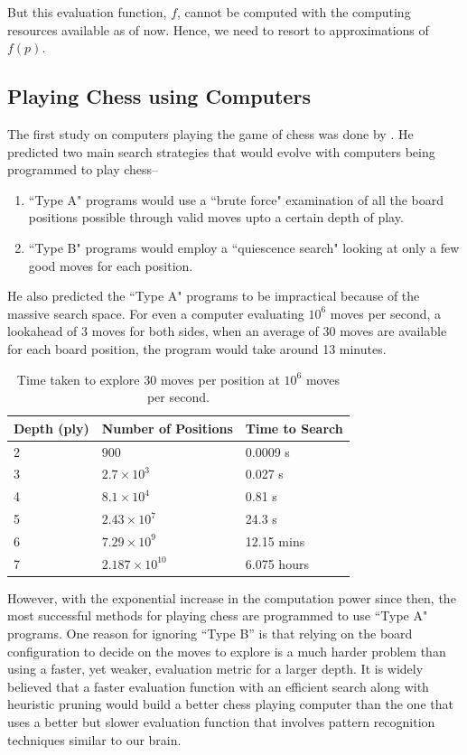 But this evaluation function, $f$, cannot be computed with the computing 
resources available as of now. Hence, we need to resort to approximations of 
$f(p)$.


\subsection{Playing Chess using Computers}
\label{section:playing-background}
The first study on computers playing the game of chess was done by 
\citet{shannon1950xxii}. He predicted two main search strategies that would 
evolve with computers being programmed to play chess--
\begin{enumerate}
\item ``Type A" programs would use a ``brute force" examination of all the 
board 
positions possible through valid moves upto a certain depth of play.
\item ``Type B" programs would employ a ``quiescence search" looking at only a 
few good moves for each position. 
\end{enumerate}
He also predicted the ``Type A" programs to be impractical because of the 
massive search space. For even a computer evaluating $10^6$ moves per second, a 
lookahead of 3 moves for both sides, when an average of 30 moves are available 
for each board position, the program would take around 13 minutes.\\
\begin{table}[h]
\centering
\begin{tabular}{lll}
\toprule
Depth (ply) & Number of Positions & Time to Search \\ 
\midrule
2           & $900$                 & 0.0009 s       \\ 
3           & $2.7\times10^3$       & 0.027 s        \\ 
4           & $8.1\times10^4$       & 0.81 s         \\ 
5           & $2.43\times 10^7$    & 24.3 s         \\ 
6           & $7.29\times 10^9$    & 12.15 mins     \\ 
7           & $2.187\times 10^{10}$& 6.075 hours    \\ \bottomrule
\end{tabular}
\caption{Time taken to explore 30 moves per position at $10^6$ moves per 
second.}
\label{table:time-taken}
\end{table}

However, with the exponential increase in the computation power since then, the 
most successful methods for playing chess are programmed to use ``Type A" 
programs. One reason for ignoring ``Type B'' is that relying on the board 
configuration to decide on the moves to explore is a much harder problem than 
using a faster, yet weaker, evaluation metric for a larger depth. It is widely 
believed that a faster evaluation function with an efficient search along with 
heuristic pruning would build a better chess playing computer than the one that 
uses a better but slower evaluation function that involves pattern recognition 
techniques similar to our brain.

